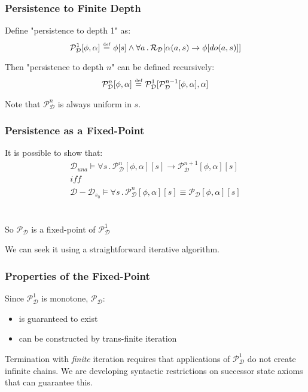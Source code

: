 \documentclass[compress]{beamer}
\newcommand{\isdef}{\hbox{$\stackrel{\mbox{\tiny def}}{=}$}}
\begin{document}
\begin{frame}
\frametitle{Persistence to Finite Depth}
Define "persistence to depth 1" as:
\begin{equation*}
  \mathcal{P}^1_{\mathcal{D}}[\phi,\alpha]\,\,\isdef\,\,\phi[s] \wedge \forall a\,.\,\mathcal{R}_{\mathcal{D}}[\alpha(a,s)\rightarrow \phi[do(a,s)]]
\end{equation*}

Then "persistence to depth $n$" can be defined recursively:
\begin{equation*}
  \mathcal{P}^n_{\mathcal{D}}[\phi,\alpha]\,\,\isdef\,\,\mathcal{P}^1_{\mathcal{D}}[\mathcal{P}^{n-1}_{\mathcal{D}}[\phi,\alpha],\alpha]
\end{equation*}

Note that $\mathcal{P}^{n}_{\mathcal{D}}$ is always uniform in $s$.
\end{frame}

\begin{frame}
\frametitle{Persistence as a Fixed-Point}
It is possible to show that:
\begin{gather*}
\mathcal{D}_{una}\models\forall s\,.\,\mathcal{P}_{\mathcal{D}}^{n}[\phi,\alpha][s]\rightarrow\mathcal{P}_{\mathcal{D}}^{n+1}[\phi,\alpha][s]\label{eqn:pn_persists}\\
\mathit{iff}\nonumber \\
\mathcal{D}-\mathcal{D}_{s_{0}}\models\forall s\,.\,\mathcal{P}_{\mathcal{D}}^{n}[\phi,\alpha][s]\equiv\mathcal{P_{D}}[\phi,\alpha][s]\label{eqn:pn_equiv_persists}
\end{gather*}
\ \\
\ \\
So $\mathcal{P}_{\mathcal{D}}$ is a fixed-point of $\mathcal{P}^1_{\mathcal{D}}$

We can seek it using a straightforward iterative algorithm.
\end{frame}

\begin{frame}
\frametitle{Properties of the Fixed-Point}
Since $\mathcal{P}^1_{\mathcal{D}}$ is monotone, $\mathcal{P}_{\mathcal{D}}$:
\begin{itemize}
  \item is guaranteed to exist
  \item can be constructed by trans-finite iteration
\end{itemize}

Termination with \emph{finite} iteration requires that applications of $\mathcal{P}^1_{\mathcal{D}}$ do not create infinite chains.  We are developing syntactic restrictions on successor state axioms that can guarantee this.
\end{frame}
\end{document}
